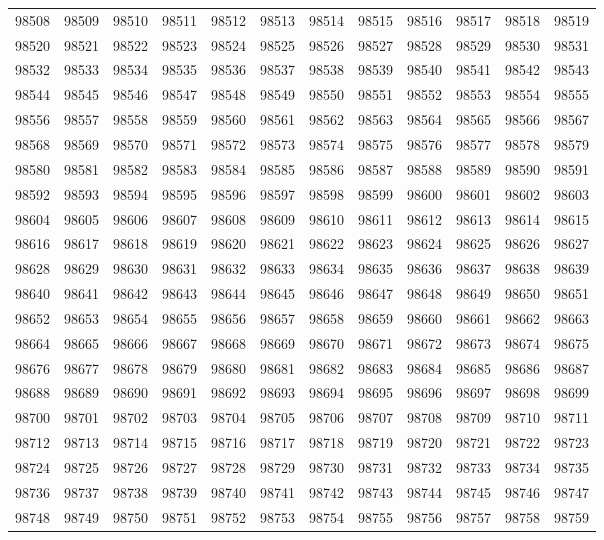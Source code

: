 \begin{center}
\begin{longtable}{llllllllllll}
98508 &98509 &98510 &98511 &98512 &98513 &98514 &98515 &98516 &98517 &98518 &98519 \\
98520 &98521 &98522 &98523 &98524 &98525 &98526 &98527 &98528 &98529 &98530 &98531 \\
98532 &98533 &98534 &98535 &98536 &98537 &98538 &98539 &98540 &98541 &98542 &98543 \\
98544 &98545 &98546 &98547 &98548 &98549 &98550 &98551 &98552 &98553 &98554 &98555 \\
98556 &98557 &98558 &98559 &98560 &98561 &98562 &98563 &98564 &98565 &98566 &98567 \\
98568 &98569 &98570 &98571 &98572 &98573 &98574 &98575 &98576 &98577 &98578 &98579 \\
98580 &98581 &98582 &98583 &98584 &98585 &98586 &98587 &98588 &98589 &98590 &98591 \\
98592 &98593 &98594 &98595 &98596 &98597 &98598 &98599 &98600 &98601 &98602 &98603 \\
98604 &98605 &98606 &98607 &98608 &98609 &98610 &98611 &98612 &98613 &98614 &98615 \\
98616 &98617 &98618 &98619 &98620 &98621 &98622 &98623 &98624 &98625 &98626 &98627 \\
98628 &98629 &98630 &98631 &98632 &98633 &98634 &98635 &98636 &98637 &98638 &98639 \\
98640 &98641 &98642 &98643 &98644 &98645 &98646 &98647 &98648 &98649 &98650 &98651 \\
98652 &98653 &98654 &98655 &98656 &98657 &98658 &98659 &98660 &98661 &98662 &98663 \\
98664 &98665 &98666 &98667 &98668 &98669 &98670 &98671 &98672 &98673 &98674 &98675 \\
98676 &98677 &98678 &98679 &98680 &98681 &98682 &98683 &98684 &98685 &98686 &98687 \\
98688 &98689 &98690 &98691 &98692 &98693 &98694 &98695 &98696 &98697 &98698 &98699 \\
98700 &98701 &98702 &98703 &98704 &98705 &98706 &98707 &98708 &98709 &98710 &98711 \\
98712 &98713 &98714 &98715 &98716 &98717 &98718 &98719 &98720 &98721 &98722 &98723 \\
98724 &98725 &98726 &98727 &98728 &98729 &98730 &98731 &98732 &98733 &98734 &98735 \\
98736 &98737 &98738 &98739 &98740 &98741 &98742 &98743 &98744 &98745 &98746 &98747 \\
98748 &98749 &98750 &98751 &98752 &98753 &98754 &98755 &98756 &98757 &98758 &98759 \\

\end{longtable}
\end{center}
